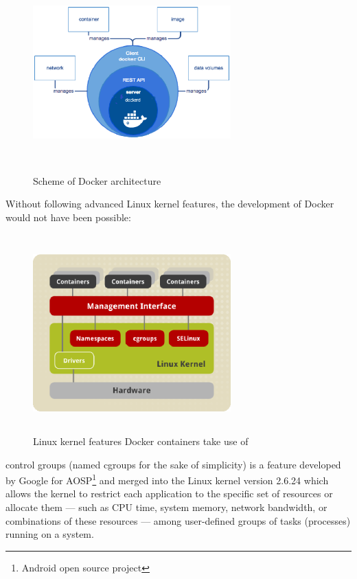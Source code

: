 \begin{figure}
\includegraphics[height=3in, width=3in]{dockerarch}
\caption{Scheme of Docker architecture}
\end{figure}

Without following advanced Linux kernel features,
the development of Docker would not have been possible:

\begin{figure}
\includegraphics[height=3in, width=3in]{dockerLinuxKernel}
\caption{Linux kernel features Docker containers take use of}
\end{figure}

control groups (named cgroups for the sake of simplicity) is
a feature developed by Google
for AOSP\footnote{Android open source project} and merged
into the Linux kernel version 2.6.24\cite{CGroupsMerged}
which allows the kernel to restrict
each application to the specific set of resources or allocate them —
such as CPU time, system memory, network bandwidth,
or combinations of these resources — among user-defined groups
of tasks (processes) running on a system.\cite{CGroupsDefinition}

